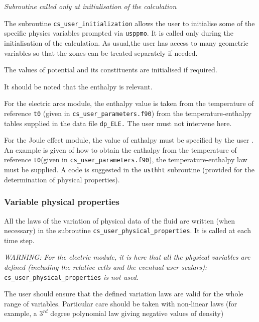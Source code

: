 {{{\noindent
\textit{Subroutine called only at initialisation of the calculation}

The subroutine \texttt{cs\_user\_initialization} allows the user to initialise some of the specific physics variables prompted via \texttt{usppmo}. It is called only during the initialisation of the calculation. As usual,the user has access to many geometric variables so
 that the zones can be treated separately if needed.

The values of potential and its constituents are initialised if required.

It should be noted that the enthalpy is relevant.

\begin{list}{-}{}
\item For the electric arcs module, the enthalpy value is taken from the temperature
 of reference \texttt{t0} (given in \texttt{cs\_user\_parameters.f90}) from the temperature-enthalpy
 tables
 supplied in the data file \texttt{dp\_ELE.} The user must not intervene here.
\item For the Joule effect module, the value of enthalpy must be specified by the user
. An example is given of how to obtain the enthalpy from the temperature of reference
 \texttt{t0}(given in \texttt{cs\_user\_parameters.f90}), the temperature-enthalpy law must be
supplied. A code is suggested in the \texttt{usthht} subroutine (provided for
 the determination of physical properties).
\end{list}

\subsubsection{Variable physical properties}

All the laws of the variation of physical data of the fluid are written (when necessary)
in the subroutine \texttt{cs\_user\_physical\_properties}. It is called at each time step.

{\em WARNING: For the electric module, it is here that all the physical variables are defined
 (including the relative cells and the eventual user scalars):} \texttt{cs\_user\_physical\_properties} {\em {is not used.}}

The user should ensure that the defined variation laws are valid for the whole range of
variables. Particular care should be taken with non-linear laws (for example, a
 $3^{rd}$ degree polynomial law giving negative values of density)

}}}

